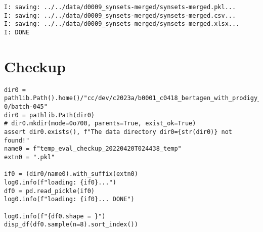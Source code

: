 \documentclass[a4paper,10pt,onecolumn,oneside,openright]{article}
\begin{document}
\begin{verbatim}
I: saving: ../../data/d0009_synsets-merged/synsets-merged.pkl...
I: saving: ../../data/d0009_synsets-merged/synsets-merged.csv...
I: saving: ../../data/d0009_synsets-merged/synsets-merged.xlsx...
I: DONE
\end{verbatim}

\section{Checkup}
\label{sec:org5ffeb5a}
\begin{verbatim}
dir0 = pathlib.Path().home()/"cc/dev/c2023a/b0001_c0418_bertagen_with_prodigy_and_spacy/data/input-0/batch-045"
dir0 = pathlib.Path(dir0)
# dir0.mkdir(mode=0o700, parents=True, exist_ok=True)
assert dir0.exists(), f"The data directory dir0={str(dir0)} not found!"
name0 = f"temp_eval_checkup_20220420T024438_temp"
extn0 = ".pkl"

if0 = (dir0/name0).with_suffix(extn0)
log0.info(f"loading: {if0}...")
df0 = pd.read_pickle(if0)
log0.info(f"loading: {if0}... DONE")

log0.info(f"{df0.shape = }")
disp_df(df0.sample(n=8).sort_index())
\end{verbatim}
\end{document}
